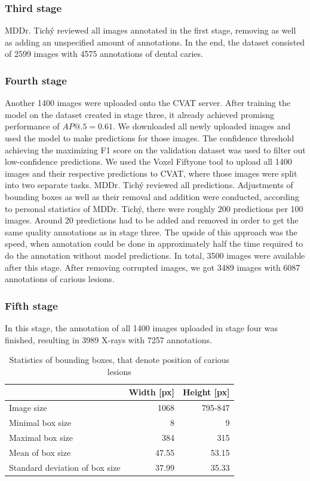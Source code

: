 \subsubsection{Third stage}
MDDr. Tichý reviewed all images annotated in the first stage, removing as well as adding an unspecified amount of annotations. In the end, the dataset consisted of 2599 images with 4575 annotations of dental caries.

\subsubsection{Fourth stage}
Another 1400 images were uploaded onto the CVAT server. After training the model on the dataset created in stage three, it already achieved promisng performance of $AP@.5=0.61$. We downloaded all newly uploaded images and used the model to make predictions for those images. The confidence threshold achieving the maximizing F1 score on the validation dataset was used to filter out low-confidence predictions. We used the Voxel Fiftyone tool to upload all 1400 images and their respective predictions to CVAT, where those images were split into two separate tasks.
MDDr. Tichý reviewed all predictions. Adjustments of bounding boxes as well as their removal and addition were conducted, according to personal statistics of MDDr. Tichý, there were roughly 200 predictions per 100 images. Around 20 predictions had to be added and removed in order to get the same quality annotations as in stage three. The upside of this approach was the speed, when annotation could be done in approximately half the time required to do the annotation without model predictions. In total, 3500 images were available after this stage. After removing corrupted images, we got 3489 images with 6087 annotations of carious lesions.

\subsubsection{Fifth stage}
In this stage, the annotation of all 1400 images uploaded in stage four was finished, resulting in 3989 X-rays with 7257 annotations.

\begin{table}
    \centering
    \begin{tabular}{l|r|r}
                                       & Width [px] & Height [px] \\\hline
        Image size                     & 1068       & 795-847     \\ \hline
        Minimal box size               & 8          & 9           \\ \hline
        Maximal box size               & 384        & 315         \\ \hline
        Mean of box size               & 47.55      & 53.15       \\ \hline
        Standard deviation of box size & 37.99      & 35.33       \\ \hline
    \end{tabular}
    \caption{\label{tab:dataset_statistics}Statistics of bounding boxes, that denote position of carious lesions}
\end{table}

